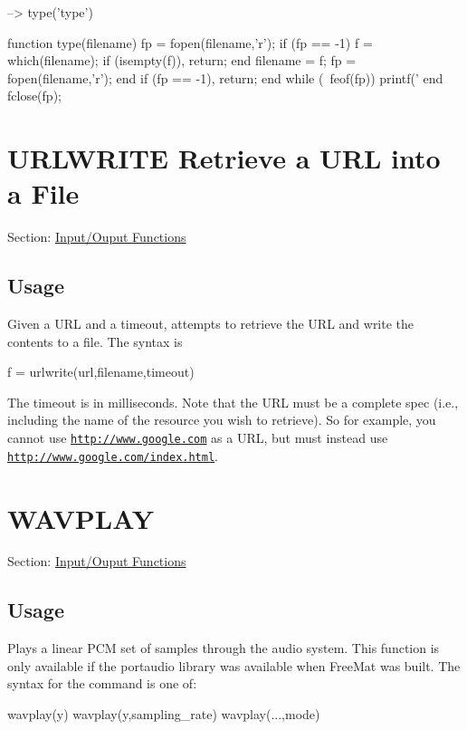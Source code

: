 \begin{DoxyVerbInclude}
--> type('type')

function type(filename)
fp = fopen(filename,'r');
if (fp == -1)
  f = which(filename);
  if (isempty(f)), return; end
  filename = f;
  fp = fopen(filename,'r');
end
if (fp == -1), return; end
while (~feof(fp))
  printf('%
end
fclose(fp);
\end{DoxyVerbInclude}
 \hypertarget{io_urlwrite}{}\section{U\-R\-L\-W\-R\-I\-T\-E Retrieve a U\-R\-L into a File}\label{io_urlwrite}
Section\-: \hyperlink{sec_io}{Input/\-Ouput Functions} \hypertarget{vtkwidgets_vtkxyplotwidget_Usage}{}\subsection{Usage}\label{vtkwidgets_vtkxyplotwidget_Usage}
Given a U\-R\-L and a timeout, attempts to retrieve the U\-R\-L and write the contents to a file. The syntax is \begin{DoxyVerb}   f = urlwrite(url,filename,timeout)
\end{DoxyVerb}
 The {\ttfamily timeout} is in milliseconds. Note that the U\-R\-L must be a complete spec (i.\-e., including the name of the resource you wish to retrieve). So for example, you cannot use {\ttfamily \href{http://www.google.com}{\tt http\-://www.\-google.\-com}} as a U\-R\-L, but must instead use {\ttfamily \href{http://www.google.com/index.html}{\tt http\-://www.\-google.\-com/index.\-html}}. \hypertarget{io_wavplay}{}\section{W\-A\-V\-P\-L\-A\-Y}\label{io_wavplay}
Section\-: \hyperlink{sec_io}{Input/\-Ouput Functions} \hypertarget{vtkwidgets_vtkxyplotwidget_Usage}{}\subsection{Usage}\label{vtkwidgets_vtkxyplotwidget_Usage}
Plays a linear P\-C\-M set of samples through the audio system. This function is only available if the {\ttfamily portaudio} library was available when Free\-Mat was built. The syntax for the command is one of\-: \begin{DoxyVerb}   wavplay(y)
   wavplay(y,sampling_rate)
   wavplay(...,mode)
\end{DoxyVerb}
